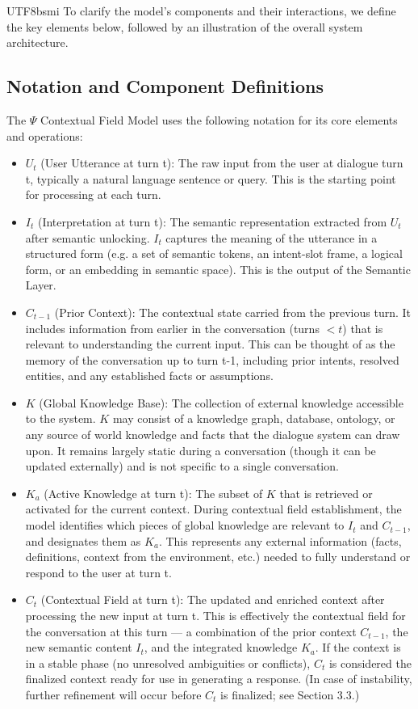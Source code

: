 \documentclass{article}
\begin{document}
\begin{CJK*}{UTF8}{bsmi}
To clarify the model’s components and their interactions, we define the key elements below, followed by an illustration of the overall system architecture.

\subsection{Notation and Component Definitions}
The $\Psi$ Contextual Field Model uses the following notation for its core elements and operations:
\begin{itemize}[label=●]
    \item $U_t$ (User Utterance at turn t): The raw input from the user at dialogue turn t, typically a natural language sentence or query. This is the starting point for processing at each turn.
    \item $I_t$ (Interpretation at turn t): The semantic representation extracted from $U_t$ after semantic unlocking. $I_t$ captures the meaning of the utterance in a structured form (e.g. a set of semantic tokens, an intent-slot frame, a logical form, or an embedding in semantic space). This is the output of the Semantic Layer.
    \item $C_{t-1}$ (Prior Context): The contextual state carried from the previous turn. It includes information from earlier in the conversation (turns $< t$) that is relevant to understanding the current input. This can be thought of as the memory of the conversation up to turn t-1, including prior intents, resolved entities, and any established facts or assumptions.
    \item $K$ (Global Knowledge Base): The collection of external knowledge accessible to the system. $K$ may consist of a knowledge graph, database, ontology, or any source of world knowledge and facts that the dialogue system can draw upon. It remains largely static during a conversation (though it can be updated externally) and is not specific to a single conversation.
    \item $K_a$ (Active Knowledge at turn t): The subset of $K$ that is retrieved or activated for the current context. During contextual field establishment, the model identifies which pieces of global knowledge are relevant to $I_t$ and $C_{t-1}$, and designates them as $K_a$. This represents any external information (facts, definitions, context from the environment, etc.) needed to fully understand or respond to the user at turn t.
    \item $C_t$ (Contextual Field at turn t): The updated and enriched context after processing the new input at turn t. This is effectively the contextual field for the conversation at this turn — a combination of the prior context $C_{t-1}$, the new semantic content $I_t$, and the integrated knowledge $K_a$. If the context is in a stable phase (no unresolved ambiguities or conflicts), $C_t$ is considered the finalized context ready for use in generating a response. (In case of instability, further refinement will occur before $C_t$ is finalized; see Section 3.3.)

\end{itemize}
\end{CJK*}
\end{document}
